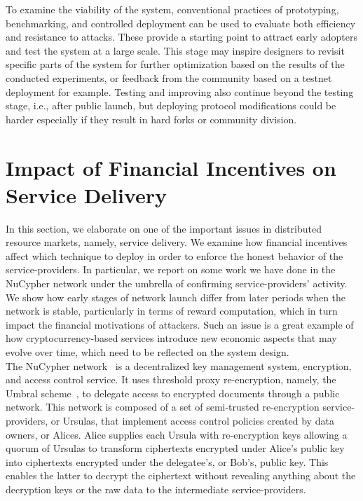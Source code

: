 \documentclass{llncs}
\begin{document}
 To examine the viability of the system, conventional practices of prototyping, benchmarking, and controlled deployment can be used to evaluate both efficiency and resistance to attacks. These provide a starting point to attract early adopters and test the system at a large scale. This stage may inspire designers to revisit specific parts of the system for further optimization based on the results of the conducted experiments, or feedback from the community based on a testnet deployment for example. Testing and improving also continue beyond the testing stage, i.e., after public launch, but deploying protocol modifications could be harder especially if they result in hard forks or community division.


\section{Impact of Financial Incentives on Service Delivery}
\vspace{-4pt}
In this section, we elaborate on one of the important issues in distributed resource markets, namely, service delivery. We examine how financial incentives affect which technique to deploy in order to enforce the honest behavior of the service-providers. In particular, we report on some work we have done in the NuCypher network under the umbrella of confirming service-providers' activity. We show how early stages of network launch differ from later periods when the network is stable, particularly in terms of reward computation, which in turn impact the financial motivations of attackers. Such an issue is a great example of how cryptocurrency-based services introduce new economic aspects that may evolve over time, which need to be reflected on the system design. \\


 The NuCypher network~\cite{nucypher,egorov2017nucypher} is a decentralized key management
system, encryption, and access control service. It uses threshold proxy re-encryption, namely, the
Umbral scheme~\cite{umbral2018}, to delegate access to encrypted
documents through a public network. This network is composed of a set of semi-trusted
re-encryption service-providers, or Ursulas, that implement access control policies created by data
owners, or Alices. Alice supplies each Ursula with re-encryption keys allowing a quorum of Ursulas to transform
ciphertexts encrypted under Alice's public key into ciphertexts encrypted under the delegatee's, or Bob's,
public key. This enables the latter to decrypt the ciphertext without revealing anything about the
decryption keys or the raw data to the intermediate service-providers.
\end{document}

